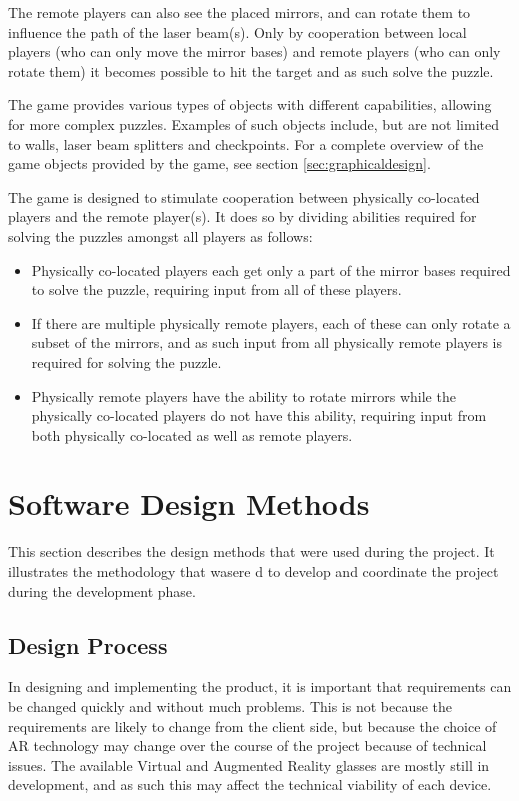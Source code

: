 		The remote players can also see the placed mirrors, and can rotate them
		to influence the path of the laser beam(s). Only by cooperation between
		local players (who can only move the mirror bases) and remote players
		(who can only rotate them) it becomes possible to hit the target and as
		such solve the puzzle.
		
		The game provides various types of objects with different capabilities, 
		allowing for more complex puzzles. Examples of such objects include,
		but are not limited to walls, laser beam splitters and checkpoints.
		For a complete overview of the game objects provided by the game, see
		section \ref{sec:graphicaldesign}.
		
		The game is designed to stimulate cooperation between physically
		co-located players and the remote player(s). It does so by
		dividing abilities required for solving the puzzles amongst all players
		as follows:
		
		\begin{itemize}
			\item Physically co-located players each get only a part of the
			mirror bases required to solve the puzzle, requiring input
			from all of these players.
			\item If there are multiple physically remote players, each of
			these can only rotate a subset of the mirrors, and
			as such input from all physically remote players is
			required for solving the puzzle.
			\item Physically remote players have the ability to rotate
			mirrors while the physically co-located players do not have
			this ability, requiring input from both physically co-located
			as well as remote players.
		\end{itemize}
	
	\section{Software Design Methods} \label{sec:designmethods}
		This section describes the design methods that were used during the
		project. It illustrates the methodology that wasere d to develop and
		coordinate the project during the development phase.
	
		\subsection{Design Process} \label{ssec:designprocess}
			In designing and implementing the product, it is important that
			requirements can be changed quickly and without much problems. This is
			not because the requirements are likely to change from the client
			side, but because the choice of AR technology may change over the
			course of the project because of technical issues. The available Virtual
			and Augmented Reality glasses are mostly still in development, and as
			such this may affect the technical viability of each device.
			
